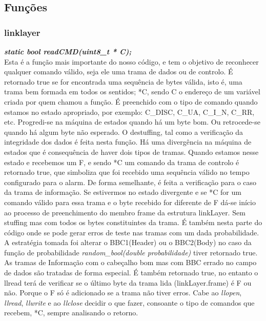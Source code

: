 \documentclass[a4paper]{article}
\begin{document}

\subsection{Funções}
\subsubsection{linklayer}
\textbf{\textit{static bool readCMD(uint8\_t * C);}}\\
Esta é a função mais importante do nosso código, e tem o objetivo de reconhecer
qualquer comando válido, seja ele uma trama de dados ou de controlo. É
retornado true se for encontrada uma sequência de bytes válida, isto é, uma
trama bem formada em todos os sentidos; *C, sendo C o endereço de um variável
criada por quem chamou a função. É preenchido com o tipo de comando quando
estamos no estado apropriado, por exemplo: C\_DISC, C\_UA, C\_I\_N, C\_RR, etc.
Progredi-se na máquina de estados quando há um byte bom. Ou retrocede-se quando
há algum byte não esperado. O destuffing, tal como a verificação da integridade
dos dados é feita nesta função. Há uma divergência na máquina de estados que é
consequência de haver dois tipos de tramas. Quando estamos nesse estado e
recebemos um F, e sendo *C um comando da trama de controlo é retornado true,
que simboliza que foi recebido uma sequência válido no tempo configurado para o
alarm. De forma semelhante, é feita a verificação para o caso da trama de
informação. Se estivermos no estado divergente e se *C for um comando válido
para essa trama e o byte recebido for diferente de F dá-se início ao processo
de preenchimento do membro frame da estrutura linkLayer. Sem stuffing mas com
todos os bytes constituintes da trama. É também nesta parte do código onde se
pode gerar erros de teste nas tramas com um dada probabilidade. A estratégia
tomada foi alterar o BBC1(Header) ou o BBC2(Body) no caso da função de
probabilidade \textit{random\_bool(double probabilidade)} tiver retornado true.
As tramas de Informação com o cabeçalho bom mas com BBC errado no campo de
dados são tratadas de forma especial. É também retornado true, no entanto o
llread terá de verificar se o último byte da trama lida (linkLayer.frame) é F
ou não. Porque o F só é adicionado se a trama não tiver erros. Cabe ao
\textit{llopen}, \textit{llread}, \textit{llwrite} e ao \textit{llclose}
decidir o que fazer, consoante o tipo de comandos que recebem, *C, sempre
analisando o retorno.\\
\end{document}
